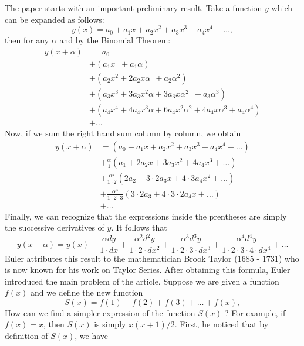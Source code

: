 The paper starts with an important preliminary result. Take a function $y$ which can be expanded as follows:
$$y(x) = a_0 + a_1x + a_2x^2 + a_3x^3 + a_4x^4 + \dots,$$
then for any $\alpha$ and by the Binomial Theorem:
\begin{align*}
    y(x+\alpha) &= \ a_0 \\
    &+ \left(a_1 x \ \, \, \! + a_1 \alpha\right) \\
    &+ \left(a_2 x^2 + 2a_2 x \alpha \ \ \!+ a_2 \alpha^2\right) \\
    &+ \left(a_3 x^3 + 3a_3 x^2 \alpha + 3 a_3 x\alpha^2 \, \, \,  + a_3 \alpha^3\right) \\
    &+ \left(a_4 x^4 + 4a_4 x^3 \alpha + 6 a_4 x^2 \alpha^2 + 4 a_4 x \alpha^3 + a_4 \alpha^4 \right) \\
    &+ \dots
\end{align*}
Now, if we sum the right hand sum column by column, we obtain
\begin{align*}
    y(x+\alpha) &= (a_0 + a_1 x + a_2 x^2 + a_3 x^3 + a_4 x^4 + \dots) \\
    &+ \frac{\alpha}{1}(a_1 + 2a_2x + 3a_3 x^2 + 4 a_4 x^3 + \dots) \\
    &+ \frac{\alpha^2}{1\cdot 2}(2a_2 + 3\cdot 2 a_3x + 4\cdot 3 a_4 x^2 + \dots) \\
    &+ \frac{\alpha^3}{1\cdot 2 \cdot 3}(3\cdot 2 a_3 + 4\cdot 3 \cdot 2 a_4 x + \dots)\\
    &+ \dots
\end{align*}
Finally, we can recognize that the expressions inside the prentheses are simply the successive derivatives of $y$. It follows that 
\begin{equation} \label{Taylor's Formula}
    y(x + \alpha) = y(x) + \frac{\alpha dy}{1\cdot dx} + \frac{\alpha^2d^2y}{1\cdot 2\cdot dx^2} + \frac{\alpha^3d^3y}{1\cdot 2\cdot 3 \cdot  dx^3} + \frac{\alpha^4d^4y}{1\cdot 2\cdot 3 \cdot 4\cdot dx^4} + \dots
\end{equation}
Euler attributes this result to the mathematician Brook Taylor (1685 - 1731) who is now known for his work on Taylor Series. After obtaining this formula, Euler introduced the main problem of the article. Suppose we are given a function $f(x)$ and we define the new function
\begin{equation}
    S(x) = f(1) + f(2) + f(3) + \dots + f(x),
\end{equation} 
How can we find a simpler expression of the function $S(x)$ ? For example, if $f(x) = x$, then $S(x)$ is simply $x(x+1)/2$. First, he noticed that by definition of $S(x)$, we have
